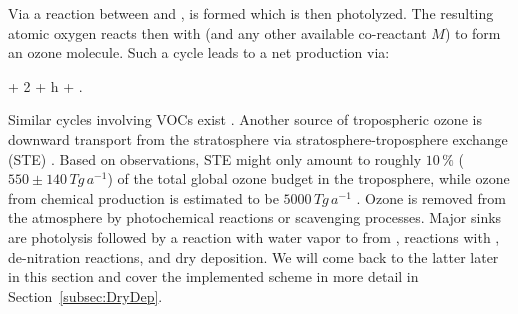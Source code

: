 \documentclass[gmd, manuscript]{copernicus}
\begin{document}
Via a reaction between  and ,  is formed which is then photolyzed. The resulting atomic oxygen reacts then with  (and any other available co-reactant $M$) to form an ozone molecule.
Such a cycle leads to a net production via:
\begin{reaction}
   + 2 + h\nu \rightarrow {} + .
\end{reaction}
Similar cycles involving VOCs exist \citep{ACP:Monks2015}. Another source of tropospheric ozone is downward transport from the stratosphere via stratosphere-troposphere exchange (STE) \citep{WMO2014}. Based on observations, STE might only amount to roughly $10\,\unit{\%}$ ($550 \pm 140\,\unit{Tg\,a^{-1}}$) of the total global ozone budget in the troposphere, while ozone from chemical production is estimated to be $5000\,\unit{Tg\,a^{-1}}$ \citep{ACP:Monks2015}. Ozone is removed from the atmosphere by photochemical reactions or scavenging processes. Major sinks are photolysis followed by a reaction with water vapor to from ,
reactions with ,
de-nitration reactions,
and dry deposition. We will come back to the latter later in this section and cover the implemented scheme in more detail in Section~\ref{subsec:DryDep}.
\end{document}
